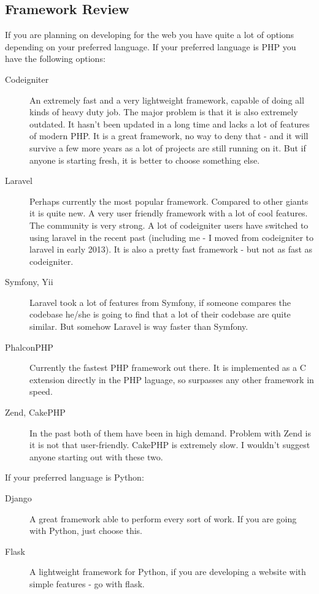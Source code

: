\documentclass{article}
\begin{document}
\subsection{Framework Review}
If you are planning on developing for the web you have quite a lot of options depending on your preferred language.
If your preferred language is PHP you have the following options:
\begin{description}
	\item[Codeigniter] An extremely fast and a very lightweight framework, capable of doing all kinds of heavy duty job.
		The major problem is that it is also extremely outdated. It hasn't been updated in a long time and lacks a lot of
		features of modern PHP. It is a great framework, no way to deny that - and it will survive a few more years
		as a lot of projects are still running on it. 
		But if anyone is starting fresh, it is better to choose something else.
	\item[Laravel] Perhaps currently the most popular framework. Compared to other giants it is quite new.
		A very user friendly framework with a lot of cool features.
		The community is very strong. A lot of codeigniter users have switched to using laravel in the recent past
		(including me - I moved from codeigniter to laravel in early 2013).
		It is also a pretty fast framework - but not as fast as codeigniter.
	\item[Symfony, Yii] Laravel took a lot of features from Symfony, if someone compares the codebase he/she is going to
		find that a lot of their codebase are quite similar. But somehow Laravel is way faster than Symfony.
	\item[PhalconPHP] Currently the fastest PHP framework out there. It is implemented as a C extension directly in the PHP laguage,
		so surpasses any other framework in speed.
	\item[Zend, CakePHP] In the past both of them have been in high demand. Problem with Zend is it is not that user-friendly.
		CakePHP is extremely slow. I wouldn't suggest anyone starting out with these two.
\end{description}
If your preferred language is Python:
\begin{description}
	\item[Django] A great framework able to perform every sort of work. If you are going with Python, just choose this.
	\item[Flask] A lightweight framework for Python, if you are developing a website with simple features - go with flask.
\end{description}
\end{document}
